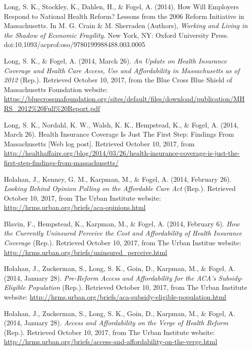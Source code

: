 \documentclass[margin, 10pt]{res} %
\begin{document}
\begin{resume}
Long, S. K., Stockley, K., Dahlen, H., \& Fogel, A. (2014). How Will Employers Respond to National Health Reform? Lessons from the 2006 Reform Initiative in Massachusetts. In M. G. Crain \& M. Sherraden (Authors), {\sl Working and Living in the Shadow of Economic Fragility}. New York, NY: Oxford University Press. doi:10.1093/acprof:oso/9780199988488.003.0005

Long, S. K., \& Fogel, A. (2014, March 26). {\sl An Update on Health Insurance Coverage and Health Care Access, Use and Affordability in Massachusetts as of 2012} (Rep.). Retrieved October 10, 2017, from the Blue Cross Blue Shield of Massachusetts Foundation website: \url{https://bluecrossmafoundation.org/sites/default/files/download/publication/MHRS_2012%20Full%20Report.pdf}

Long, S. K., Nordahl, K. W., Walsh, K. K., Hempstead, K., \& Fogel, A. (2014, March 26). Health Insurance Coverage Is Just The First Step: Findings From Massachusetts [Web log post]. Retrieved October 10, 2017, from \url{http://healthaffairs.org/blog/2014/03/26/health-insurance-coverage-is-just-the-first-step-findings-from-massachusetts/}

Holahan, J., Kenney, G. M., Karpman, M., \& Fogel, A. (2014, February 26). {\sl Looking Behind Opinion Polling on the Affordable Care Act} (Rep.). Retrieved October 10, 2017, from The Urban Institute website: \url{http://hrms.urban.org/briefs/aca-opinions.html}

Blavin, F., Hempstead, K., Karpman, M., \& Fogel, A. (2014, February 6). {\sl How the Currently Uninsured Perceive the Cost and Affordability of Health Insurance Coverage} (Rep.). Retrieved October 10, 2017, from The Urban Institue website: \url{http://hrms.urban.org/briefs/uninsured_perceive.html}

Holahan, J., Zuckerman, S., Long, S. K., Goin, D., Karpman, M., \& Fogel, A. (2014, January 28). {\sl Pre-Reform Access and Affordability for the ACA's Subsidy-Eligible Population} (Rep.). Retrieved October 10, 2017, from The Urban Institute website: \url{http://hrms.urban.org/briefs/aca-subsidy-eligible-population.html}

Holahan, J., Zuckerman, S., Long, S. K., Goin, D., Karpman, M., \& Fogel, A. (2014, January 28). {\sl Access and Affordability on the Verge of Health Reform} (Rep.). Retrieved October 10, 2017, from The Urban Institute website: \url{http://hrms.urban.org/briefs/access-and-affordability-on-the-verge.html}




\end{resume}
\end{document}
